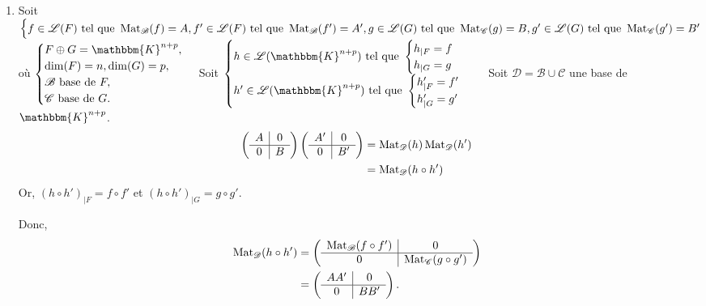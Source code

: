 \begin{prv}
	\begin{enumerate}
		\item Soit $\begin{cases}
				f \in \mathcal{L}(F) \text{ tel que } \operatorname{Mat}_\mathcal{B}(f) = A,
				f' \in \mathcal{L}(F) \text{ tel que } \operatorname{Mat}_\mathcal{B}(f') = A',
				g \in \mathcal{L}(G) \text{ tel que } \operatorname{Mat}_\mathcal{C}(g) = B,
				g' \in \mathcal{L}(G) \text{ tel que } \operatorname{Mat}_\mathcal{C}(g') = B'
			\end{cases}$ où $\begin{cases}
				F \oplus G = \mathbbm{K}^{n+p},\\
				\dim(F) = n, \dim(G) = p,\\
				\mathcal{B} \text{ base de } F,\\
				\mathcal{C} \text{ base de } G.\\
			\end{cases}$
			Soit $\begin{cases}
				h \in \mathcal{L}(\mathbbm{K}^{n+p}) \text{ tel que } \begin{cases}
					h_{|F} = f\\
					h_{|G} = g
				\end{cases}\\
				h' \in \mathcal{L}(\mathbbm{K}^{n+p}) \text{ tel que } \begin{cases}
					h'_{|F} = f'\\
					h'_{|G} = g'\\
				\end{cases}
			\end{cases}$
			Soit $\mathcal{D} = \mathcal{B} \cup \mathcal{C}$ une base de $\mathbbm{K}^{n+p}$.
			\begin{align*}
				\left(\begin{array}{c|c}
					A&0\\ \hline
					0&B
				\end{array}\right)
				\left(\begin{array}{c|c}
					A'&0\\ \hline
					0&B'
				\end{array}\right) &= \operatorname{Mat}_{\mathcal{D}}(h) \operatorname{Mat}_{\mathcal{D}}(h')\\
				&= \operatorname{Mat}_{\mathcal{D}}(h \circ h') \\
			\end{align*}
			Or, $(h \circ h')_{|F} = f \circ f'$ et $(h \circ h')_{|G} = g \circ g'$.

			Donc,
			\begin{align*}
				\operatorname{Mat}_\mathcal{D}(h \circ h') &=
					\left(\begin{array}{c|c}
						\operatorname{Mat}_\mathcal{B}(f \circ f')&0\\ \hline
						0&\operatorname{Mat}_\mathcal{C}(g \circ g')
					\end{array}\right)\\
				&=\left(\begin{array}{c|c}
					AA'&0\\ \hline
					0&BB'
				\end{array}\right).
			\end{align*}
	\end{enumerate}
\end{prv}

